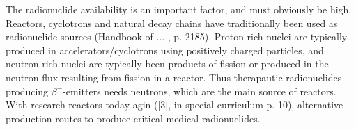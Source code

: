 \documentclass[a4paper,11pt,twoside]{book}
\begin{document}
The radionuclide availability is an important factor, and must obviously be high. Reactors, cyclotrons and natural decay chains have traditionally been used as radionuclide sources (Handbook of ... , p. 2185). Proton rich nuclei are typically produced in accelerators/cyclotrons using positively charged particles, and neutron rich nuclei are typically been products of fission or produced in the neutron flux resulting from fission in a reactor. Thus therapautic radionuclides producing $\beta^-$-emitters needs neutrons, which are the main source of reactors. With research reactors today agin ([3], in special curriculum p. 10), alternative production routes to produce critical medical radionuclides. \\
\end{document}
